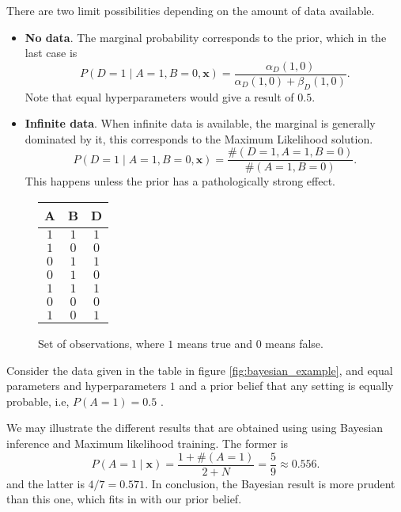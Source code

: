 \documentclass[11pt]{article}
\theoremstyle{definition}
\begin{document}
There are two limit possibilities depending on the amount of data available.
\begin{itemize}
  \item \textbf{No data}. The marginal probability corresponds to the prior, which
in the last case is
    \[
    P(D = 1 \mid A = 1, B = 0, \bm{x}) = \frac{\alpha_{D}(1,0)}{\alpha_{D}(1,0) + \beta_{D}(1,0)}.
    \]
    Note that equal hyperparameters would give a result of \(0.5\).\newline
   
  \item \textbf{Infinite data}. When infinite data is available, the marginal is generally dominated by it,
    this corresponds to the Maximum Likelihood solution.
    \[
    P(D = 1 \mid A = 1, B = 0, \bm{x}) = \frac{\#(D = 1, A = 1 , B = 0)}{\#(A = 1, B = 0)}.
    \]
    This happens unless the prior has a pathologically strong effect.
\end{itemize}

\begin{figure}
  \centering
  \begin{tabular}{ccc}
\hline
  A & B & D \\ \hline
  \(1\) & \(1\) & \(1\) \\
  \(1\) & \(0\) & \(0\) \\
  \(0\) & \(1\) & \(1\) \\
  \(0\) & \(1\) & \(0\) \\
  \(1\) & \(1\) & \(1\) \\
  \(0\) & \(0\) & \(0\) \\
  \(1\) & \(0\) & \(1\) \\ \hline
\end{tabular}
\caption{Set of observations, where \(1\) means true and \(0\) means false.}\label{tab:bn_ex}
\end{figure}

 Consider the data given in the table in figure \ref{fig:bayesian_example}, and
 equal parameters and hyperparameters \(1\) and a prior belief that any setting is equally probable, i.e, \( P(A=1) = 0.5\) . 
 
 We may illustrate the different results that are obtained using using Bayesian inference and Maximum likelihood training. The former is
 \[
   P(A = 1 \mid \bm{x}) = \frac{1 + \#(A = 1)}{2 + N} = \frac{5}{9} \approx 0.556.
 \]
 and the latter is \(4/7 = 0.571\). In conclusion, the Bayesian
 result is more prudent than this one, which fits in with our prior belief.
\end{document}
